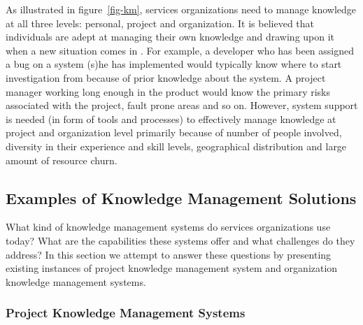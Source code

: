 As illustrated in figure~\ref{fig-km}, services organizations need to manage knowledge at all three levels: personal, project and organization. It is believed that individuals are adept at managing their own knowledge and drawing upon it when a new situation comes in \cite{Bruce:2005}. For example, a developer who has been assigned a bug on a system (s)he has implemented would typically know where to start investigation from because of prior knowledge about the system. A project manager working long enough in the product would know the primary risks associated with the project, fault prone areas and so on. However, system support is needed (in form of tools and processes) to effectively manage knowledge at project and organization level primarily because of number of people involved, diversity in their experience and skill levels, geographical distribution and large amount of resource churn.  

\subsection{Examples of Knowledge Management Solutions}

What kind of knowledge management systems do services organizations use today? What are the capabilities these systems offer and what challenges do they address? In this section we attempt to answer these questions by presenting existing instances of project knowledge management system and organization knowledge management systems. 

\subsubsection{Project Knowledge Management Systems} 

